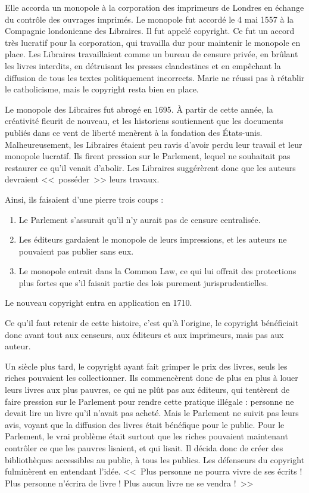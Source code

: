 Elle accorda un monopole à la corporation des imprimeurs de Londres en échange du contrôle des ouvrages imprimés.
Le monopole fut accordé le 4 mai 1557 à la Compagnie londonienne des Libraires. Il fut appelé copyright.
Ce fut un accord très lucratif pour la corporation, qui travailla dur pour maintenir le monopole en place.
Les Libraires travaillaient comme un bureau de censure privée, en brûlant les livres interdits, en détruisant les presses clandestines et en empêchant la diffusion de tous les textes politiquement incorrects.
Marie ne réussi pas à rétablir le catholicisme, mais le copyright resta bien en place.

Le monopole des Libraires fut abrogé en 1695.
À partir de cette année, la créativité fleurit de nouveau, et les historiens soutiennent que les documents publiés dans ce vent de liberté menèrent à la fondation des États-unis.
Malheureusement, les Libraires étaient peu ravis d'avoir perdu leur travail et leur monopole lucratif.
Ils firent pression sur le Parlement, lequel ne souhaitait pas restaurer ce qu'il venait d'abolir.
Les Libraires suggérèrent donc que les auteurs devraient <<~posséder~>> leurs travaux.

Ainsi, ils faisaient d'une pierre trois coups :

\begin{enumerate}
\item Le Parlement s'assurait qu'il n'y aurait pas de censure centralisée.
\item Les éditeurs gardaient le monopole de leurs impressions, et les auteurs ne pouvaient pas publier sans eux.
\item Le monopole entrait dans la Common Law, ce qui lui offrait des protections plus fortes que s'il faisait partie des lois purement jurisprudentielles.
\end{enumerate}\bigskip

Le nouveau copyright entra en application en 1710.

Ce qu'il faut retenir de cette histoire, c'est qu'à l'origine, le copyright bénéficiait donc avant tout aux censeurs, aux éditeurs et aux imprimeurs, mais pas aux auteur.

Un siècle plus tard, le copyright ayant fait grimper le prix des livres, seuls les riches pouvaient les collectionner.
Ils commencèrent donc de plus en plus à louer leurs livres aux plus pauvres, ce qui ne plût pas aux éditeurs, qui tentèrent de faire pression sur le Parlement pour rendre cette pratique illégale : personne ne devait lire un livre qu'il n'avait pas acheté.
Mais le Parlement ne suivit pas leurs avis, voyant que la diffusion des livres était bénéfique pour le public.
Pour le Parlement, le vrai problème était surtout que les riches pouvaient maintenant contrôler ce que les pauvres lisaient, et qui lisait.
Il décida donc de créer des bibliothèques accessibles au public, à tous les publics.
Les défenseurs du copyright fulminèrent en entendant l'idée.
<<~Plus personne ne pourra vivre de ses écrits ! Plus personne n'écrira de livre ! Plus aucun livre ne se vendra !~>>

